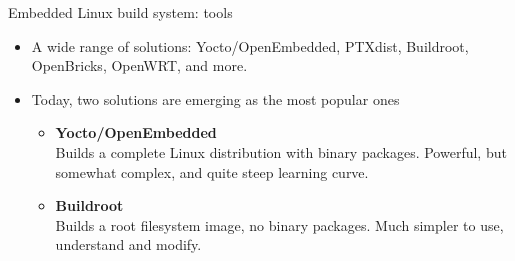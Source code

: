 \begin{frame}{Embedded Linux build system: tools}
  \begin{itemize}
  \item A wide range of solutions: Yocto/OpenEmbedded, PTXdist,
    Buildroot, OpenBricks, OpenWRT, and more.
  \item Today, two solutions are emerging as the most popular ones
    \begin{itemize}
    \item {\bf Yocto/OpenEmbedded}\\Builds a complete Linux
      distribution with binary packages. Powerful, but somewhat
      complex, and quite steep learning curve.
    \item {\bf Buildroot}\\Builds a root filesystem image, no binary
      packages. Much simpler to use, understand and modify.
    \end{itemize}
  \end{itemize}
\end{frame}
